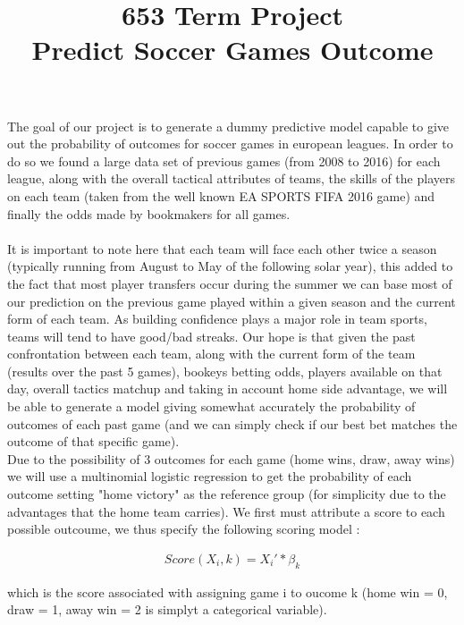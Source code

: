 \documentclass[letterpaper, 11pt]{article}
\title{653 Term Project \\ Predict Soccer Games Outcome}
\theoremstyle{break}
\begin{document}
				
				\maketitle{}
				
				
				The goal of our project is to generate a dummy predictive model capable to give out the probability of outcomes for soccer games in european leagues. In order to do so we found a large data set of previous games (from 2008 to 2016) for each league, along with the overall tactical attributes of teams, the skills of the players on each team (taken from the well known EA SPORTS FIFA 2016 game) and finally the odds made by bookmakers for all games. \\\\
				
				It is important to note here that each team will face each other twice a season (typically running from August to May of the following solar year), this added to the fact that most player transfers occur during the summer we can base most of our prediction on the previous game played within a given season and the current form of each team. As building confidence plays a major role in team sports, teams will tend to have good/bad streaks. Our hope is that given the past confrontation between each team, along with the current form of the team (results over the past 5 games), bookeys betting odds, players available on that day, overall tactics matchup and taking in account home side advantage, we will be able to generate a model giving somewhat accurately the probability of outcomes of each past game (and we can simply check if our best bet matches the outcome of that specific game).\\
				
				Due to the possibility of 3 outcomes for each game (home wins, draw, away wins) we will use a multinomial logistic regression to get the probability of each outcome setting "home victory" as the reference group (for simplicity due to the advantages that the home team carries). We first must attribute a score to each possible outcoume, we thus specify the following scoring model : 
				
				\begin{align*}
				Score (X_i, k) = X_i' * \beta_k
				\end{align*}
				
				
				which is the score associated with assigning game i to oucome k (home win = 0, draw = 1, away win = 2 is simplyt a categorical variable).
				
\end{document}
